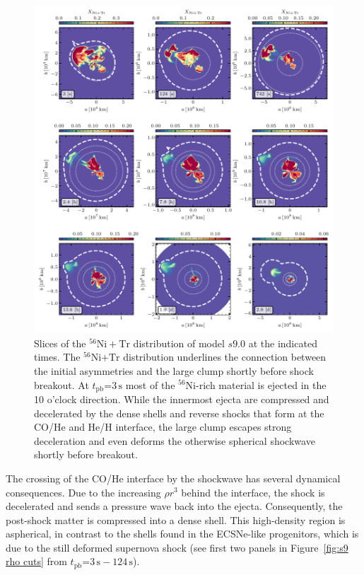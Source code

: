 \documentclass[fleqn,usenatbib]{mnras}
\newcommand{\tpb}{\ensuremath{t_{\text{pb}}}}
\newcommand{\nickel}{\ensuremath{\mathrm{^{56}Ni}}\xspace}
\newcommand{\tracer}{\ensuremath{\mathrm{Tr}}\xspace}
\newcommand{\s}{\ensuremath{\text{s}}}
\begin{document}
\begin{figure}%
\centering
\includegraphics[width=\textwidth]{pic/s9_3d_3x3_NiX.pdf}
    \caption{Slices of the $\nickel+ \tracer$ distribution of model $s9.0$ at the indicated times.
    The $\nickel\mathord{+}\tracer$ distribution underlines the connection between the initial asymmetries and the 
    large clump shortly before shock breakout. 
    At $\tpb\mathord{=}3\,\s$ most of the \nickel-rich material is ejected in the 10 o'clock direction. While
    the innermost ejecta are compressed and decelerated by the dense shells and reverse shocks that 
    form at the CO/He and He/H interface, the large clump escapes strong deceleration and even deforms the 
    otherwise spherical shockwave shortly before breakout.
    }
\label{fig:s9 nix cuts}
\end{figure}%

The crossing of the CO/He interface by the shockwave has several dynamical consequences. 
Due to the increasing $\rho r^3$ behind the interface, the shock is 
decelerated and sends a pressure wave back into the ejecta. Consequently, 
the post-shock matter is compressed into a
dense shell. This high-density region is aspherical,
in contrast to the shells found in the ECSNe-like progenitors, which is due to the still  
deformed supernova shock (see first two panels in Figure~\ref{fig:s9 rho cuts} 
from  $\tpb\mathord{=}3\,\s-124\,\s$).
\end{document}
